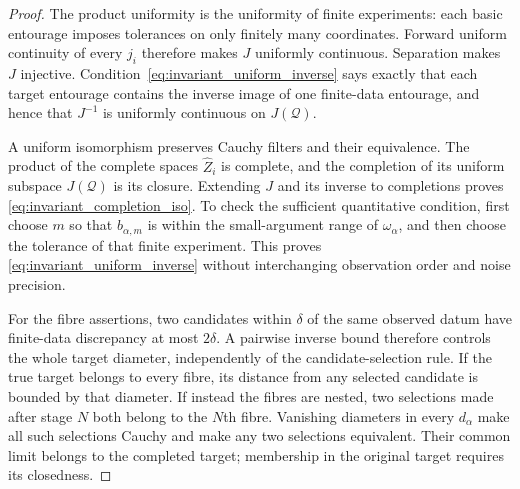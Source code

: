 \documentclass[11pt,a4paper]{amsart}
\numberwithin{equation}{section}
\theoremstyle{definition}
\theoremstyle{remark}
\begin{document}
\begin{proof}
The product uniformity is the uniformity of finite experiments: each basic entourage imposes tolerances on only finitely many coordinates. Forward uniform continuity of every $j_i$ therefore makes $J$ uniformly continuous. Separation makes $J$ injective. Condition~\eqref{eq:invariant_uniform_inverse} says exactly that each target entourage contains the inverse image of one finite-data entourage, and hence that $J^{-1}$ is uniformly continuous on $J(\mathcal Q)$.

A uniform isomorphism preserves Cauchy filters and their equivalence. The product of the complete spaces $\widehat Z_i$ is complete, and the completion of its uniform subspace $J(\mathcal Q)$ is its closure. Extending $J$ and its inverse to completions proves \eqref{eq:invariant_completion_iso}. To check the sufficient quantitative condition, first choose $m$ so that $b_{\alpha,m}$ is within the small-argument range of $\omega_\alpha$, and then choose the tolerance of that finite experiment. This proves \eqref{eq:invariant_uniform_inverse} without interchanging observation order and noise precision.

For the fibre assertions, two candidates within $\delta$ of the same observed datum have finite-data discrepancy at most $2\delta$. A pairwise inverse bound therefore controls the whole target diameter, independently of the candidate-selection rule. If the true target belongs to every fibre, its distance from any selected candidate is bounded by that diameter. If instead the fibres are nested, two selections made after stage $N$ both belong to the $N$th fibre. Vanishing diameters in every $d_\alpha$ make all such selections Cauchy and make any two selections equivalent. Their common limit belongs to the completed target; membership in the original target requires its closedness.
\end{proof}
\end{document}
